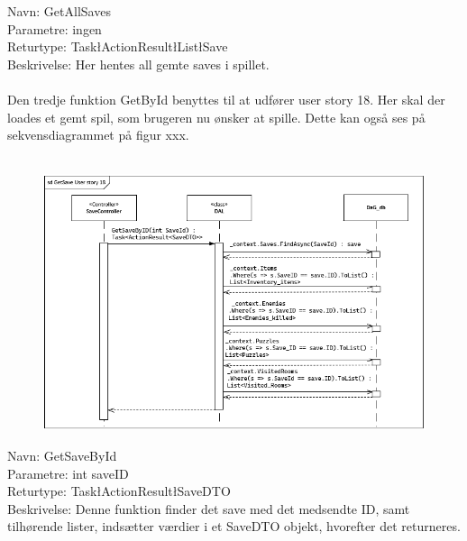 Navn: GetAllSaves\\
Parametre: ingen\\
Returtype: Task\l ActionResult\l List\l Save\g\g\g \\
Beskrivelse: Her hentes all gemte saves i spillet.\\\\

Den tredje funktion GetById benyttes til at udfører user story 18.
Her skal der loades et gemt spil, som brugeren nu ønsker at spille. 
Dette kan også ses på sekvensdiagrammet på figur xxx.\\\\

\begin{figure}[H]
\centering
\includegraphics[width = \textwidth]{02-Body/Images/DAL-Database/GetSavesByIdSd.PNG}
\caption{}
\label{fig:DAL-Sekvens-18}
\end{figure}

Navn: GetSaveById \\
Parametre: int saveID\\
Returtype: Task\l ActionResult\l SaveDTO\g\g\\
Beskrivelse: Denne funktion finder det save med det medsendte ID, samt tilhørende lister, indsætter værdier i et SaveDTO objekt, hvorefter det returneres.\\